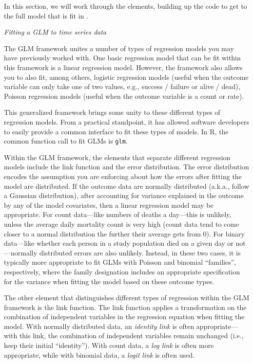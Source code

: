 \documentclass[
]{book}
\begin{document}
In this section, we will work through the elements, building up the code to
get to the full model that is fit in \citet{vicedo2019hands}.

\emph{Fitting a GLM to time series data}

The GLM framework unites a number of types of regression models you may have
previously worked with. One basic regression model that can be fit within this
framework is a linear regression model. However, the framework also allows you
to also fit, among others, logistic regression models (useful when the outcome
variable can only take one of two values, e.g., success / failure or alive /
dead), Poisson regression models (useful when the outcome variable is a count or
rate).

This generalized framework brings some unity to these different types of
regression models. From a practical standpoint, it has allowed software
developers to easily provide a common interface to fit these types of models.
In R, the common function call to fit GLMs is \texttt{glm}.

Within the GLM framework, the elements that separate different regression models
include the link function and the error distribution. The error distribution
encodes the assumption you are enforcing about how the errors after fitting the
model are distributed. If the outcome data are normally distributed (a.k.a.,
follow a Gaussian distribution), after accounting for variance explained in the
outcome by any of the model covariates, then a linear regression model may be
appropriate. For count data---like numbers of deaths a day---this is unlikely,
unless the average daily mortality count is very high (count data tend to
come closer to a normal distribution the further their average gets from
0). For binary data---like whether each person in a study population died on
a given day or not---normally distributed errors are also unlikely. Instead,
in these two cases, it is typically more appropriate to fit GLMs with
Poisson and binomial ``families'', respectively, where the family designation
includes an appropriate specification for the variance when fitting the model
based on these outcome types.

The other element that distinguishes different types of regression within
the GLM framework is the link function. The link function applies a transformation
on the combination of independent variables in the regression equation
when fitting the model. With normally distributed data, an \emph{identity link}
is often appropriate---with this link, the combination of independent variables
remain unchanged (i.e., keep their initial ``identity''). With count data, a
\emph{log link} is often more appropriate, while with binomial data, a \emph{logit link}
is often used.
\end{document}
